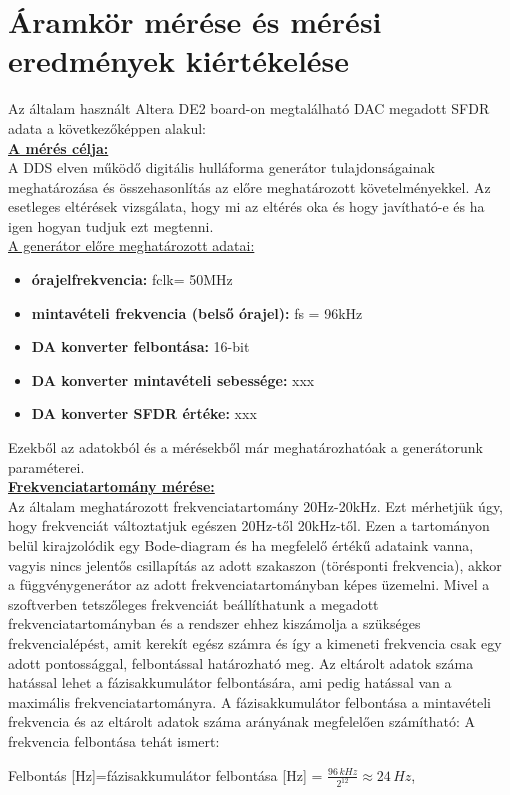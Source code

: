 \documentclass[a4paper,12pt]{article}
\begin{document}
	\section{Áramkör mérése és mérési eredmények kiértékelése}
	Az általam használt Altera DE2 board-on megtalálható DAC megadott SFDR adata a következőképpen alakul:\\
		\textbf{\underline{A mérés célja:}}\\
		A DDS elven működő digitális hulláforma generátor tulajdonságainak meghatározása és összehasonlítás az előre meghatározott követelményekkel. Az esetleges eltérések vizsgálata, hogy mi az eltérés oka és hogy javítható-e és ha igen hogyan tudjuk ezt megtenni.\\
		\underline{A generátor előre meghatározott adatai:}
		\begin{itemize}
			\item\textbf{órajelfrekvencia:} fclk= 50MHz
			\item\textbf{mintavételi frekvencia (belső órajel):} fs = 96kHz 
			\item\textbf{DA konverter felbontása:} 16-bit 
			\item\textbf{DA konverter mintavételi sebessége:}    xxx
			\item\textbf{DA konverter SFDR értéke:}  xxx
		\end{itemize}
		Ezekből az adatokból és a mérésekből már meghatározhatóak a generátorunk paraméterei.\\
		\textbf{\underline{Frekvenciatartomány mérése:}}\\
		Az általam meghatározott frekvenciatartomány 20Hz-20kHz. Ezt mérhetjük úgy, hogy frekvenciát változtatjuk egészen 20Hz-től 20kHz-től. Ezen a tartományon belül kirajzolódik egy Bode-diagram és ha megfelelő értékű adataink vanna, vagyis nincs jelentős csillapítás az adott szakaszon (törésponti frekvencia), akkor a függvénygenerátor az adott frekvenciatartományban képes üzemelni.
		Mivel a szoftverben tetszőleges frekvenciát beállíthatunk a megadott frekvenciatartományban és a rendszer ehhez kiszámolja a szükséges frekvencialépést, amit kerekít egész számra és így a kimeneti frekvencia csak egy adott pontossággal, felbontással határozható meg. Az eltárolt adatok száma hatással lehet a fázisakkumulátor felbontására, ami pedig hatással van a maximális frekvenciatartományra. A fázisakkumulátor felbontása a mintavételi frekvencia és az eltárolt adatok száma arányának megfelelően számítható: A frekvencia felbontása tehát ismert:\\ 
		\begin{center}
			Felbontás [Hz]=fázisakkumulátor felbontása [Hz] = $\frac{96\,kHz}{2^{12}} \approx 24\,Hz$,
		\end{center}
\end{document}
